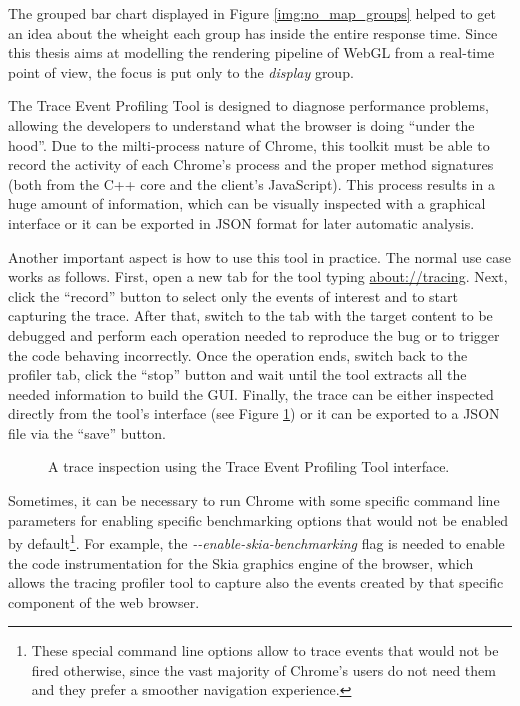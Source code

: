 The grouped bar chart displayed in Figure \ref{img:no_map_groups} helped to
get an idea about the wheight each group has inside the entire response time.
Since this thesis aims at modelling the rendering pipeline of WebGL from a real-time
point of view, the focus is put only to the \emph{display} group.

The Trace Event Profiling Tool is designed to diagnose performance problems,
allowing the developers to understand what the browser is doing ``under the hood''.
Due to the milti-process nature of Chrome, this toolkit must be able to record
the activity of each Chrome's process and the proper method signatures (both from the C++
core and the client's JavaScript). This process results in a huge amount of
information, which can be visually inspected with a graphical interface or it
can be exported in JSON format for later automatic analysis.

Another important aspect is how to use this tool in practice. The normal use case
works as follows. First, open a new tab for the tool typing \url{about://tracing}.
Next, click the ``record'' button to select only the events of interest and to
start capturing the trace. After that, switch to the tab with the target content
to be debugged and perform each operation needed to reproduce the bug or to trigger
the code behaving incorrectly. Once the operation ends, switch back to the profiler
tab, click the ``stop'' button and wait until the tool extracts all the needed
information to build the GUI. Finally, the trace can be either inspected directly
from the tool's interface (see Figure \ref{img:chrome_profiler}) or it can be
exported to a JSON file via the ``save'' button.
\begin{figure}[!htb]
    \caption{A trace inspection using the Trace Event Profiling Tool interface.}
    \label{img:chrome_profiler}
\end{figure}

Sometimes, it can be necessary to run Chrome with some specific command
line parameters for enabling specific benchmarking options that would not be
enabled by default\footnote{These special command line options allow to trace
events that would not be fired otherwise, since the vast majority of Chrome's
users do not need them and they prefer a smoother navigation experience.}.
For example, the \emph{-{}-enable-skia-benchmarking} flag is needed to enable the
code instrumentation for the Skia graphics engine of the browser, which allows
the tracing profiler tool to capture also the events created by that specific
component of the web browser.



